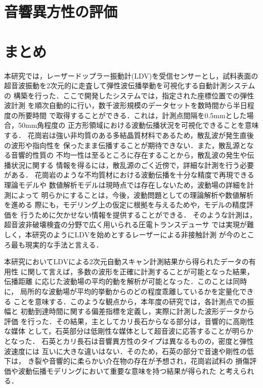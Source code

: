 ﻿\documentclass[11pt,a4j]{jarticle}
\begin{document}
\section{音響異方性の評価}
%
\newpage
\section{まとめ}
本研究では，レーザードップラー振動計(LDV)を受信センサーとし，試料表面の
超音波振動を2次元的に走査して弾性波伝播挙動を可視化する自動計測システムの
構築を行った．ここで開発したシステムでは，指定された座標位置での弾性波計測
を順次自動的に行い，数千波形規模のデータセットを数時間から半日程度の所要時間
で取得することができる．これは，計測点間隔を0.5mmとした場合，50mm角程度の
正方形領域における波動伝播状況を可視化できることを意味する．
花崗岩は強い非均質のある多結晶質材料であるため，散乱波が発生直後の波形や指向性を
保ったまま伝播することが期待できない．また，散乱源となる音響的性質の
不均一性は至るところに存在することから，散乱波の発生や伝播状況に関する
情報を得るには，散乱源のごく近傍で，詳細な計測を行う必要がある．
花崗岩のような不均質材における波動伝播を十分な精度で再現できる理論モデルや
数値解析モデルは現時点では存在しないため，波動場の詳細を計測によって
明らかにすることは，今後，波動問題としての理論解析や数値解析を進める
際にも，モデリング上の仮定に根拠を与えるためや，モデルの精度評価を
行うために欠かせない情報を提供することができる．
そのような計測は，超音波非破壊検査の分野で広く用いられる圧電トランスデューサ
では実現が難しく，本研究のようにLDVを始めとするレーザーによる非接触計測
が今のところ最も現実的な手法と言える．

本研究においてLDVによる2次元自動スキャン計測結果から得られたデータの有用性
に関して言えば，多数の波形を正確に計測することが可能となった結果，伝播距離
に応じた波動場の平均的動を解析が可能となった．このことは同時に，
局所的な波動場が平均的挙動からのどの程度乖離しているかを定量化できる
ことを意味する．このような観点から，本年度の研究では，各計測点での振幅と
初動到達時間に関する偏差指標を定義し，実際に計測した波形データから評価
を行った．その結果，主としてカリ長石からなる部分は，音響的に高剛性な媒体
として，石英部分は低剛性な媒体として超音波に応答することが明らかとなった．
石英とカリ長石は音響異方性のタイプは異なるものの，密度と弾性波速度には
互いに大きな違いはない．そのため，石英の部分で音速や剛性の低下は，
き裂や音響的に柔らかい介在物の存在が予想され，花崗岩試料の
損傷評価や波動伝播モデリングにおいて重要な意味を持つ結果が得られた
と考えられる．
\end{document}
